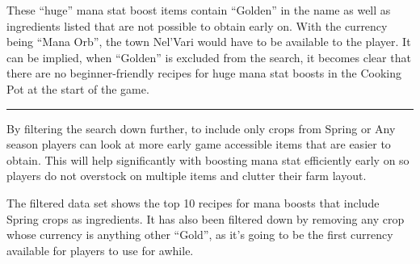 \documentclass[
]{article}
\begin{document}
These ``huge'' mana stat boost items contain ``Golden'' in the name as
well as ingredients listed that are not possible to obtain early on.
With the currency being ``Mana Orb'', the town Nel'Vari would have to be
available to the player. It can be implied, when ``Golden'' is excluded
from the search, it becomes clear that there are no beginner-friendly
recipes for huge mana stat boosts in the Cooking Pot at the start of the
game.

\begin{center}\rule{0.5\linewidth}{0.5pt}\end{center}

By filtering the search down further, to include only crops from Spring
or Any season players can look at more early game accessible items that
are easier to obtain. This will help significantly with boosting mana
stat efficiently early on so players do not overstock on multiple items
and clutter their farm layout.

The filtered data set shows the top 10 recipes for mana boosts that
include Spring crops as ingredients. It has also been filtered down by
removing any crop whose currency is anything other ``Gold'', as it's
going to be the first currency available for players to use for awhile.
\end{document}

